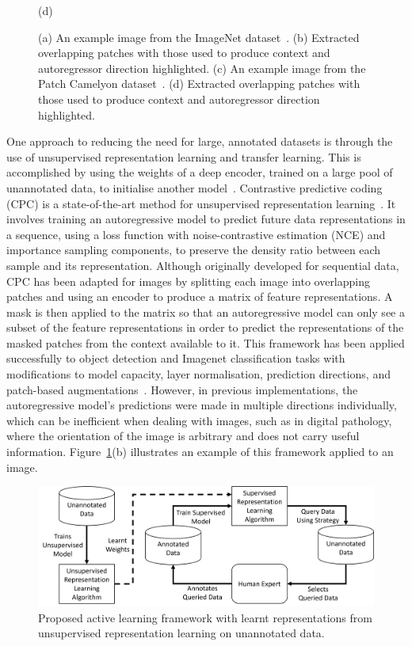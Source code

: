 \begin{figure}
\begin{minipage}[b]{.4\linewidth}
		\centerline{(d)}\medskip
	\end{minipage}
	\caption{(a) An example image from the ImageNet dataset~\citep{deng2009imagenet}. (b) Extracted overlapping patches with those used to produce context and autoregressor direction highlighted. (c) An example image from the Patch Camelyon dataset~\citep{veeling2018rotation}. (d) Extracted overlapping patches with those used to produce context and autoregressor direction highlighted.}
	\label{fig:example_cpc_patches}
\end{figure}

One approach to reducing the need for large, annotated datasets is through the use of unsupervised representation learning and transfer learning. This is accomplished by using the weights of a deep encoder, trained on a large pool of unannotated data, to initialise another model~\citep{weiss2016survey}. Contrastive predictive coding (CPC) is a state-of-the-art method for unsupervised representation learning~\citep{oord2018representation}. It involves training an autoregressive model to predict future data representations in a sequence, using a loss function with noise-contrastive estimation (NCE) and importance sampling components, to preserve the density ratio between each sample and its representation. Although originally developed for sequential data, CPC has been adapted for images by splitting each image into overlapping patches and using an encoder to produce a matrix of feature representations. A mask is then applied to the matrix so that an autoregressive model can only see a subset of the feature representations in order to predict the representations of the masked patches from the context available to it. This framework has been applied successfully to object detection and Imagenet classification tasks with modifications to model capacity, layer normalisation, prediction directions, and patch-based augmentations~\citep{henaff2020data}. However, in previous implementations, the autoregressive model’s predictions were made in multiple directions individually, which can be inefficient when dealing with images, such as in digital pathology, where the orientation of the image is arbitrary and does not carry useful information. Figure~\ref{fig:example_cpc_patches}(b) illustrates an example of this framework applied to an image.

\begin{figure}[b]
	\centering
	\includegraphics[width=\textwidth]{images/active_unsupervised_learning.png}
	\caption{Proposed active learning framework with learnt representations from unsupervised representation learning on unannotated data.}
	\label{fig:active_unsupervised_learning_framework}
\end{figure}

